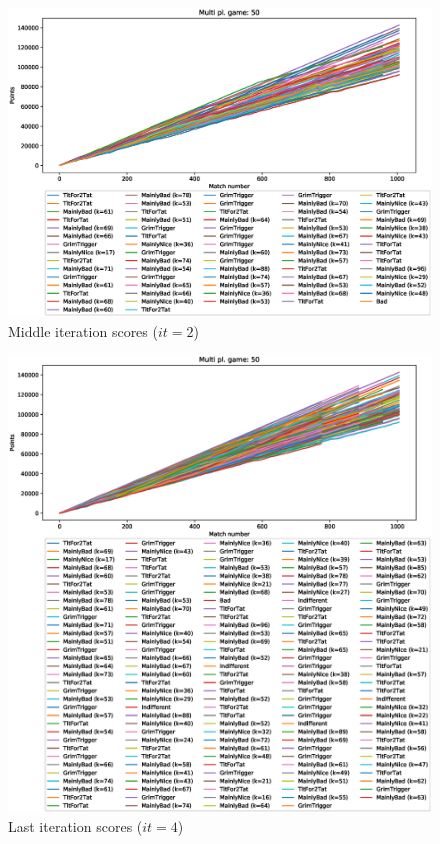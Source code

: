 \documentclass[journal,10pt,twoside]{IEEEtran}
\begin{document}
\begin{figure}[!ht]
    \centering
    \includegraphics[width=1\columnwidth]{../img/cipdmp-incr/cipdmp-scores-increasing-pop-50-r2}
    \caption{Middle iteration scores ($it=2$)}
    \label{fig:incrCMI}
\end{figure}

\begin{figure}[!ht]
    \centering
    \includegraphics[width=1\columnwidth]{../img/cipdmp-incr/cipdmp-scores-increasing-pop-50-r4}
    \caption{Last iteration scores ($it=4$)}
    \label{fig:incrCLI}
\end{figure}
\end{document}

